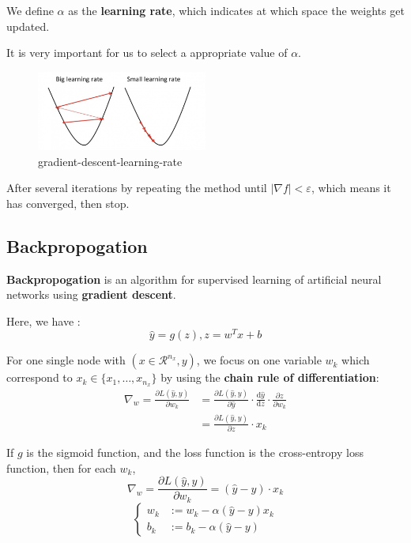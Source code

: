 \documentclass[11pt, a4paper]{article}
\begin{document}
We define $\alpha$ as the \textbf{learning rate}, which indicates at which space the weights get updated.

It is very important for us to select a appropriate value of $\alpha$.
\begin{figure}[H] %
    \centering
    \includegraphics[width=0.5\textwidth]{./fig/gradient-descent-learning-rate.png}
    \caption{gradient-descent-learning-rate}
    \label{fig:gradient-descent-learning-rate}
\end{figure}

After several iterations by repeating the method until $|\nabla f|< \varepsilon$, which means it has converged, then stop.

\subsection{Backpropogation}

\textbf{Backpropogation} is an algorithm for supervised learning of artificial neural networks using \textbf{gradient descent}.

Here, we have :
\[
\hat{y} = g(z), z = w^{T}x+b
\]

For one single node with $(x\in \mathcal{R}^{n_x},y)$, we focus on one variable $w_k$ which correspond to $x_k \in \{x_1, \ldots,x_{n_x}\}$ by using the \textbf{chain rule of differentiation}:
\begin{align*}
    \nabla_w = \frac{\partial L(\hat{y},y)}{\partial w_k}
    &= \frac{\partial L(\hat{y},y)}{\partial \hat{y}} \cdot \frac{\text{d}\hat{y}}{\text{d}z} \cdot \frac{\partial z}{\partial w_k} \\
    &= \frac{\partial L(\hat{y},y)}{\partial z} \cdot x_k 
\end{align*}

If $g$ is the sigmoid function, and the loss function is the cross-entropy loss function, then for each $w_k$,
\[
\nabla_w =\frac{\partial L(\hat{y},y)}{\partial w_k} = (\hat{y}-y) \cdot x_k
\]
\[ \begin{cases}
    w_k &:= w_k - \alpha(\hat{y}-y)x_k \\
    b_k &:= b_k - \alpha(\hat{y}-y)
\end{cases}
\]
\end{document}
